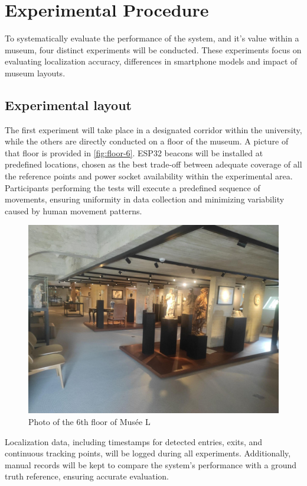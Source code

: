 \section{Experimental Procedure}

To systematically evaluate the performance of the system, and it's value within a museum, four distinct experiments will be conducted. These experiments focus on evaluating localization accuracy, differences in smartphone models and impact of museum layouts.

\subsection{Experimental layout}

The first experiment will take place in a designated corridor within the university, while the others are directly conducted on a floor of the museum. A picture of that floor is provided in \autoref{fig:floor-6}. ESP32 beacons will be installed at predefined locations, chosen as the best trade-off between adequate coverage of all the reference points and power socket availability within the experimental area. Participants performing the tests will execute a predefined sequence of movements, ensuring uniformity in data collection and minimizing variability caused by human movement patterns.

\begin{figure}
    \centering
    \includegraphics[width=0.75\linewidth]{assets/image-floor.jpg}
		\caption{Photo of the 6th floor of Musée L}
    \label{fig:floor-6}
\end{figure}

Localization data, including timestamps for detected entries, exits, and continuous tracking points, will be logged during all experiments. Additionally, manual records will be kept to compare the system's performance with a ground truth reference, ensuring accurate evaluation.

